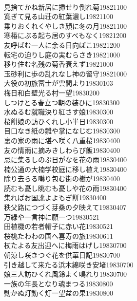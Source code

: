 \begin{multicols}{2}
\\見捨てかね新居に挿せり倒れ菊\hfill{19821100}
\\寛ぎて見る山荘の紅葉濃し\hfill{19821100}
\\乗りおくれくやしき顔に冬の月\hfill{19821100}
\\寒椿にぶる起ち居のすべもなく\hfill{19821200}
\\友呼ばむ一人に余る日向ぼこ\hfill{19821200}
\\転宅の迫りし庭の実むらさき\hfill{19821000}
\\移り住む名残の菊香衰えず\hfill{19821000}
\\玉砂利に歩の乱れなし神の留守\hfill{19821000}
\\大役の初旅冨士が雲間より\hfill{19830103}
\\梅日和白壁光る村一望\hfill{19830200}
\\しつけとる春立つ朝の装ひに\hfill{19830300}
\\水ぬるむ就職決り紅さす娘\hfill{19830300}
\\桜餅娘の訪ひくれし小半日\hfill{19830300}
\\目口なき紙の雛や掌になじむ\hfill{19830300}
\\裏の家の雨に堪へ咲く八重桜\hfill{19830400}
\\友の情雨に摘みきしわらび飯\hfill{19830400}
\\忌に集るしのぶ日がなを花の雨\hfill{19830400}
\\楠公通の大楠学校庭に移し植え\hfill{19830400}
\\除り去らる囀り包む街の樹が\hfill{19830400}
\\読むも憂し眺むも憂しや花の雨\hfill{19830400}
\\集ればお国訛よよもぎ餅\hfill{19830400}
\\秩父路につづく芽桑の夕映えて\hfill{19830407}
\\万緑や一言神に願一つ\hfill{19830521}
\\田植機の若者帽子に赤い花\hfill{19830521}
\\桜桃たわわの国へ喜寿の旅\hfill{19830611}
\\杖たよる友出迎へに梅雨はげし\hfill{19830700}
\\朝涼し咲きつぐ花を供華日記\hfill{19830700}
\\引き越して来たる浜木綿咲き安堵\hfill{19830700}
\\娘三人訪ひくれ風鈴よく鳴れり\hfill{19830700}
\\一族の年長となり魂まつる\hfill{19830800}
\\動かぬ灯動く灯一望盆の果\hfill{19830800}

\end{multicols}
